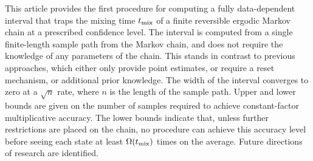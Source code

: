 This article provides the first procedure for computing a fully
data-dependent interval that traps the mixing time $t_{\operatorname{mix}}$ of a finite
reversible ergodic Markov chain at a prescribed confidence level.
The interval is computed from a single finite-length sample
path from the Markov chain, and does not require the 
knowledge of any parameters of the chain.
This stands in contrast to previous approaches, which either 
only provide point estimates, or require a
reset mechanism, or additional prior knowledge.
The width of the interval converges to zero at a
$\sqrt{n}$ rate, where $n$ is the length of the sample path.
Upper and lower bounds are given on the number of samples required to
achieve constant-factor multiplicative accuracy.
The lower bounds indicate that, unless further restrictions are placed
on the chain, no procedure can achieve this accuracy level before
seeing each state at least $\Omega(t_{\operatorname{mix}})$ times on the average.
Future directions of research are identified.


%
%
